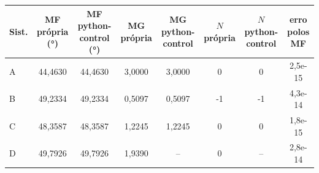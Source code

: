 \begin{tabular}{lccccccc}
\hline
Sist. & MF própria (°) & MF python-control (°) & MG própria & MG python-control & $N$ própria & $N$ python-control & erro polos MF \\
\hline
A & 44{,}4630 & 44{,}4630 & 3{,}0000 & 3{,}0000 & 0 & 0 & 2{,}5e-15 \\
B & 49{,}2334 & 49{,}2334 & 0{,}5097 & 0{,}5097 & -1 & -1 & 4{,}3e-14 \\
C & 48{,}3587 & 48{,}3587 & 1{,}2245 & 1{,}2245 & 0 & 0 & 1{,}8e-15 \\
D & 49{,}7926 & 49{,}7926 & 1{,}9390 & -- & 0 & -- & 2{,}8e-14 \\
\hline
\end{tabular}
